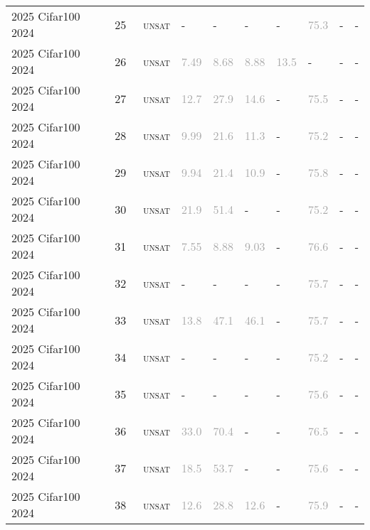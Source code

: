 \begin{center}
{\begin{longtable}{@{}llllllllll@{}}
2025 Cifar100 2024 & 25 & ~\textsc{unsat} & - & - & - & - & \textcolor{darkgray}{75.3} & - & - \\
2025 Cifar100 2024 & 26 & ~\textsc{unsat} & \textcolor{darkgray}{7.49} & \textcolor{darkgray}{8.68} & \textcolor{darkgray}{8.88} & \textcolor{darkgray}{13.5} & - & - & - \\
2025 Cifar100 2024 & 27 & ~\textsc{unsat} & \textcolor{darkgray}{12.7} & \textcolor{darkgray}{27.9} & \textcolor{darkgray}{14.6} & - & \textcolor{darkgray}{75.5} & - & - \\
2025 Cifar100 2024 & 28 & ~\textsc{unsat} & \textcolor{darkgray}{9.99} & \textcolor{darkgray}{21.6} & \textcolor{darkgray}{11.3} & - & \textcolor{darkgray}{75.2} & - & - \\
2025 Cifar100 2024 & 29 & ~\textsc{unsat} & \textcolor{darkgray}{9.94} & \textcolor{darkgray}{21.4} & \textcolor{darkgray}{10.9} & - & \textcolor{darkgray}{75.8} & - & - \\
2025 Cifar100 2024 & 30 & ~\textsc{unsat} & \textcolor{darkgray}{21.9} & \textcolor{darkgray}{51.4} & - & - & \textcolor{darkgray}{75.2} & - & - \\
2025 Cifar100 2024 & 31 & ~\textsc{unsat} & \textcolor{darkgray}{7.55} & \textcolor{darkgray}{8.88} & \textcolor{darkgray}{9.03} & - & \textcolor{darkgray}{76.6} & - & - \\
2025 Cifar100 2024 & 32 & ~\textsc{unsat} & - & - & - & - & \textcolor{darkgray}{75.7} & - & - \\
2025 Cifar100 2024 & 33 & ~\textsc{unsat} & \textcolor{darkgray}{13.8} & \textcolor{darkgray}{47.1} & \textcolor{darkgray}{46.1} & - & \textcolor{darkgray}{75.7} & - & - \\
2025 Cifar100 2024 & 34 & ~\textsc{unsat} & - & - & - & - & \textcolor{darkgray}{75.2} & - & - \\
2025 Cifar100 2024 & 35 & ~\textsc{unsat} & - & - & - & - & \textcolor{darkgray}{75.6} & - & - \\
2025 Cifar100 2024 & 36 & ~\textsc{unsat} & \textcolor{darkgray}{33.0} & \textcolor{darkgray}{70.4} & - & - & \textcolor{darkgray}{76.5} & - & - \\
2025 Cifar100 2024 & 37 & ~\textsc{unsat} & \textcolor{darkgray}{18.5} & \textcolor{darkgray}{53.7} & - & - & \textcolor{darkgray}{75.6} & - & - \\
2025 Cifar100 2024 & 38 & ~\textsc{unsat} & \textcolor{darkgray}{12.6} & \textcolor{darkgray}{28.8} & \textcolor{darkgray}{12.6} & - & \textcolor{darkgray}{75.9} & - & - \\

\end{longtable}}
\end{center}
